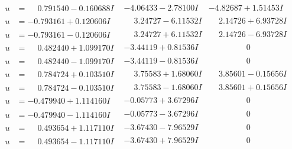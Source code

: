 \documentclass[1p]{elsarticle_modified}
\theoremstyle{definition}
\begin{document}
$$\begin{array}{c|c|c}
\begin{aligned}
u &= \phantom{-}0.791540 - 0.160688 I\end{aligned}
 & -4.06433 - 2.78100 I & -4.82687 + 1.51453 I \\ \hline\begin{aligned}
u &= -0.793161 + 0.120606 I\end{aligned}
 & \phantom{-}3.24727 - 6.11532 I & \phantom{-}2.14726 + 6.93728 I \\ \hline\begin{aligned}
u &= -0.793161 - 0.120606 I\end{aligned}
 & \phantom{-}3.24727 + 6.11532 I & \phantom{-}2.14726 - 6.93728 I \\ \hline\begin{aligned}
u &= \phantom{-}0.482440 + 1.099170 I\end{aligned}
 & -3.44119 + 0.81536 I & \phantom{-0.000000 } 0 \\ \hline\begin{aligned}
u &= \phantom{-}0.482440 - 1.099170 I\end{aligned}
 & -3.44119 - 0.81536 I & \phantom{-0.000000 } 0 \\ \hline\begin{aligned}
u &= \phantom{-}0.784724 + 0.103510 I\end{aligned}
 & \phantom{-}3.75583 + 1.68060 I & \phantom{-}3.85601 - 0.15656 I \\ \hline\begin{aligned}
u &= \phantom{-}0.784724 - 0.103510 I\end{aligned}
 & \phantom{-}3.75583 - 1.68060 I & \phantom{-}3.85601 + 0.15656 I \\ \hline\begin{aligned}
u &= -0.479940 + 1.114160 I\end{aligned}
 & -0.05773 + 3.67296 I & \phantom{-0.000000 } 0 \\ \hline\begin{aligned}
u &= -0.479940 - 1.114160 I\end{aligned}
 & -0.05773 - 3.67296 I & \phantom{-0.000000 } 0 \\ \hline\begin{aligned}
u &= \phantom{-}0.493654 + 1.117110 I\end{aligned}
 & -3.67430 - 7.96529 I & \phantom{-0.000000 } 0 \\ \hline\begin{aligned}
u &= \phantom{-}0.493654 - 1.117110 I\end{aligned}
 & -3.67430 + 7.96529 I & \phantom{-0.000000 } 0 \\ \hline\begin{aligned}

\end{aligned}
\end{array}$$
\end{document}
